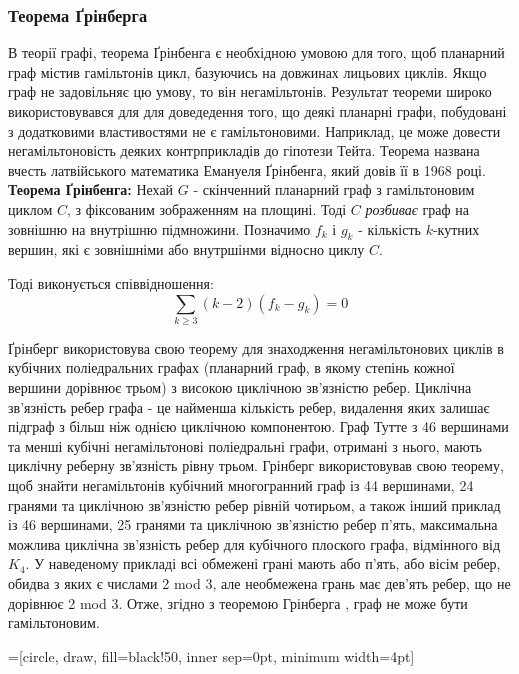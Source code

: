 \documentclass[14pt]{article}
\begin{document}
\begin{spacing}{1.175}
            \subsubsection{\normalfont Теорема Ґрінберга}
            \qquad В теорії графі, теорема Ґрінбенга є необхідною умовою для того, щоб планарний граф містив гамільтонів цикл, базуючись на довжинах лицьових циклів. Якщо граф не задовільняє цю умову, то він негамільтонів. Результат теореми широко використовувався для для доведедення того, що деякі планарні графи, побудовані з додатковими властивостями не є гамільтоновими. Наприклад, це може довести негамільтоновість деяких контрприкладів до гіпотези Тейта. Теорема названа вчесть латвійського математика Емануеля Ґрінбенга, який довів її в 1968 році.
            \\

            \textbf{Теорема Ґрінбенга:} Нехай \(G\) - скінченний планарний граф з гамільтоновим циклом \(C\), з фіксованим зображенням на площині. Тоді \(C\) \textit{розбиває} граф на зовнішню на внутрішню підмножини. Позначимо \(f_k\) і \(g_k\) - кількість \(k\)-кутних вершин, які є зовнішніми або внутршінми відносно циклу \(C\). 
            
            Тоді виконується співвідношення: $$ \sum_{k\ge3} (k - 2)(f_k - g_k) = 0 $$

            Ґрінберг використовува свою теорему для знаходження негамільтонових циклів в кубічних поліедральних графах (планарний граф, в якому степінь кожної вершини дорівнює трьом) з високою циклічною зв'язністю ребер. Циклічна зв'язність ребер графа - це найменша кількість ребер, видалення яких залишає підграф з більш ніж однією циклічною компонентою. Граф Тутте з 46 вершинами та менші кубічні негамільтонові поліедральні графи, отримані з нього, мають циклічну реберну зв’язність рівну трьом. Грінберг використовував свою теорему, щоб знайти негамільтонів кубічний многогранний граф із 44 вершинами, 24 гранями та циклічною зв’язністю ребер рівній чотирьом, а також інший приклад із 46 вершинами, 25 гранями та циклічною зв’язністю ребер п’ять, максимальна можлива циклічна зв’язність ребер для кубічного плоского графа, відмінного від \(K_4\). У наведеному прикладі всі обмежені грані мають або п’ять, або вісім ребер, обидва з яких є числами 2 mod 3, але необмежена грань має дев’ять ребер, що не дорівнює 2 mod 3. Отже, згідно з теоремою Грінберга , граф не може бути гамільтоновим.
            
            =[circle, draw, fill=black!50,
                        inner sep=0pt, minimum width=4pt]
            \begin{center}
            \end{center}

\end{spacing}
\end{document}
